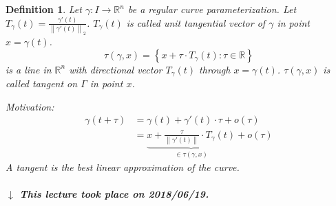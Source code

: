 \documentclass{article}
\newtheorem{definition}{Definition}  \numberwithin{definition}{section}
\newcommand{\set}[1]{\left\{#1\right\}}
\newcommand{\norm}[1]{\left\|#1\right\|}
\newcommand{\dateref}[1]{%
  \begin{mdframed}[backgroundcolor=gray!10,innerbottommargin=0pt,innertopmargin=0pt]
    \paragraph{\textit{$\downarrow$ This lecture took place on #1.}}%
  \end{mdframed}%
}
\begin{document}
\begin{definition} %
  Let $\gamma: I \to \mathbb R^n$ be a regular curve parameterization.
  Let $T_\gamma(t) = \frac{\gamma'(t)}{\norm{\gamma'(t)}_2}$.
  $T_\gamma(t)$ is called \emph{unit tangential vector} of $\gamma$ in point $x = \gamma(t)$.
  \[ \tau(\gamma, x) = \set{x + \tau \cdot T_{\gamma}(t): \tau \in \mathbb R} \]
  is a line in $\mathbb R^n$ with directional vector $T_\gamma(t)$ through $x = \gamma(t)$.
  $\tau(\gamma, x)$ is called \emph{tangent} on $\Gamma$ in point $x$.


  Motivation:
  \begin{align*}
    \gamma(t + \tau) &= \gamma(t) + \gamma'(t) \cdot \tau + o(\tau) \\
      &= \underbrace{x + \frac{\tau}{\norm{\gamma'(t)}} \cdot T_{\gamma}(t)}_{\in \tau(\gamma, x)} + o(\tau)
  \end{align*}
  A tangent is the best linear approximation of the curve.
\end{definition}

\dateref{2018/06/19}
\end{document}
